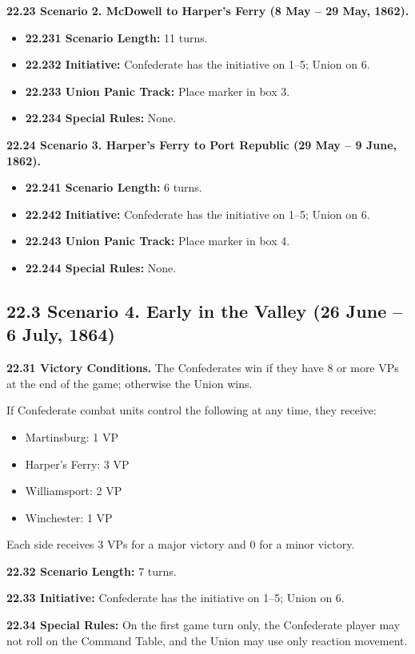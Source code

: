 \textbf{22.23 Scenario 2. McDowell to Harper's Ferry (8 May -- 29 May, 1862).}
\begin{itemize}
\item \textbf{22.231 Scenario Length:} 11 turns.
\item \textbf{22.232 Initiative:} Confederate has the initiative on 1--5; Union on 6.
\item \textbf{22.233 Union Panic Track:} Place marker in box 3.
\item \textbf{22.234 Special Rules:} None.
\end{itemize}

\textbf{22.24 Scenario 3. Harper's Ferry to Port Republic (29 May -- 9 June, 1862).}
\begin{itemize}
\item \textbf{22.241 Scenario Length:} 6 turns.
\item \textbf{22.242 Initiative:} Confederate has the initiative on 1--5; Union on 6.
\item \textbf{22.243 Union Panic Track:} Place marker in box 4.
\item \textbf{22.244 Special Rules:} None.
\end{itemize}

\subsection[22.3 Scenario 4. Early in the Valley]{22.3 Scenario 4. Early in the Valley (26 June -- 6 July, 1864)}

\textbf{22.31 Victory Conditions.} The Confederates win if they have 8 or more VPs at the end of the game; otherwise the Union wins.

If Confederate combat units control the following at any time, they receive:
\begin{itemize}
\item Martinsburg: 1 VP
\item Harper's Ferry: 3 VP
\item Williamsport: 2 VP
\item Winchester: 1 VP
\end{itemize}

Each side receives 3 VPs for a major victory and 0 for a minor victory.

\textbf{22.32 Scenario Length:} 7 turns.

\textbf{22.33 Initiative:} Confederate has the initiative on 1--5; Union on 6.

\textbf{22.34 Special Rules:} On the first game turn only, the Confederate player may not roll on the Command Table, and the Union may use only reaction movement.

